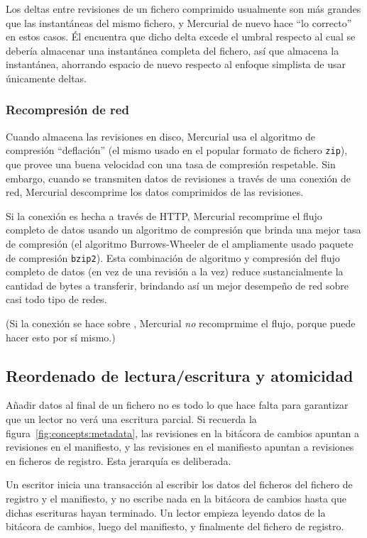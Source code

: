 Los deltas entre revisiones de un fichero comprimido usualmente son
más grandes que las instantáneas del mismo fichero, y Mercurial de
nuevo hace ``lo correcto'' en estos casos. Él encuentra que dicho
delta excede el umbral respecto al cual se debería almacenar una
instantánea completa del fichero, así que almacena la instantánea,
ahorrando espacio de nuevo respecto al enfoque simplista de usar
únicamente deltas.

\subsubsection{Recompresión de red}

Cuando almacena las revisiones en disco, Mercurial usa el algoritmo de
compresión ``deflación'' (el mismo usado en el popular formato de
fichero \texttt{zip}), que provee una buena velocidad con una tasa de
compresión respetable. Sin embargo, cuando se transmiten datos de
revisiones a través de una conexión de red, Mercurial descomprime los
datos comprimidos de las revisiones.

Si la conexión es hecha a través de HTTP, Mercurial recomprime el
flujo completo de datos usando un algoritmo de compresión que brinda
una mejor tasa de compresión (el algoritmo Burrows-Wheeler de el
ampliamente usado paquete de compresión \texttt{bzip2}). Esta
combinación de algoritmo y compresión del flujo completo de datos
(en vez de una revisión a la vez) reduce sustancialmente la cantidad
de bytes a transferir, brindando así un mejor desempeño de red sobre
casi todo tipo de redes.

(Si la conexión se hace sobre , Mercurial \emph{no}
recomprmime el flujo, porque  puede hacer esto por sí
mismo.)

\subsection{Reordenado de lectura/escritura y atomicidad}

Añadir datos al final de un fichero no es todo lo que hace falta para
garantizar que un lector no verá una escritura parcial. Si recuerda la
figura~\ref{fig:concepts:metadata}, las revisiones en la bitácora de
cambios apuntan a revisiones en el manifiesto, y las revisiones en el
manifiesto apuntan a revisiones en ficheros de registro. Esta
jerarquía es deliberada.

Un escritor inicia una transacción al escribir los datos del ficheros
del fichero de registro y el manifiesto, y no escribe nada en la
bitácora de cambios hasta que dichas escrituras hayan terminado. Un
lector empieza leyendo datos de la bitácora de cambios, luego del
manifiesto, y finalmente del fichero de registro.

